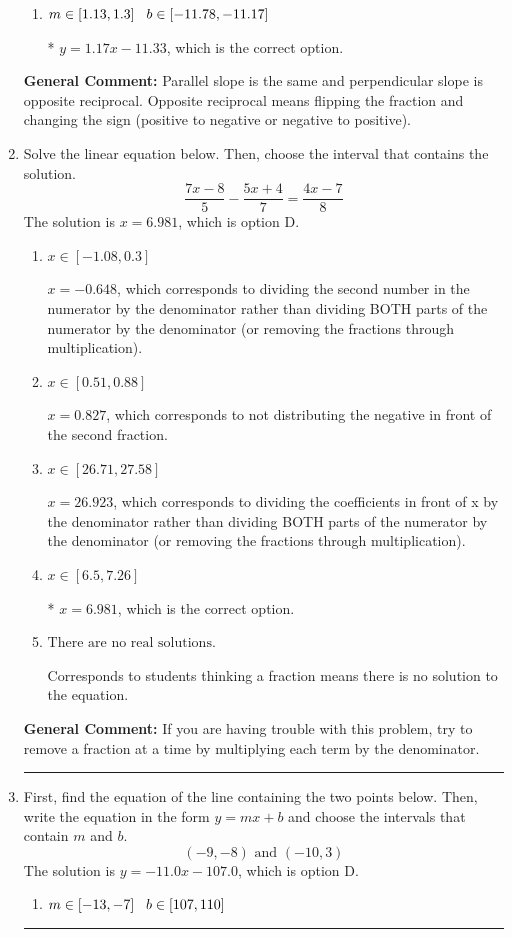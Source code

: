 \documentclass{extbook}[14pt]
\newcommand{\litem}[1]{\item #1

\rule{\textwidth}{0.4pt}}
\begin{document}
\begin{enumerate}
{\begin{enumerate}[label=\Alph*.]
 $y = 1.17x - 11.00$, which corresponds to correct slope and mis-distributing while simplifying to slope-intercept form.
\item \( m \in [1.13, 1.3] \hspace*{3mm} b \in [-11.78, -11.17] \)

* $y = 1.17x - 11.33$, which is the correct option.
\end{enumerate}

\textbf{General Comment:} Parallel slope is the same and perpendicular slope is opposite reciprocal. Opposite reciprocal means flipping the fraction and changing the sign (positive to negative or negative to positive).
}
\litem{
Solve the linear equation below. Then, choose the interval that contains the solution.
\[ \frac{7x -8}{5} - \frac{5x + 4}{7} = \frac{4x -7}{8} \]The solution is \( x = 6.981 \), which is option D.\begin{enumerate}[label=\Alph*.]
\item \( x \in [-1.08, 0.3] \)

 $x = -0.648$, which corresponds to dividing the second number in the numerator by the denominator rather than dividing BOTH parts of the numerator by the denominator (or removing the fractions through multiplication).
\item \( x \in [0.51, 0.88] \)

 $x = 0.827$, which corresponds to not distributing the negative in front of the second fraction.
\item \( x \in [26.71, 27.58] \)

 $x = 26.923$, which corresponds to dividing the coefficients in front of x by the denominator rather than dividing BOTH parts of the numerator by the denominator (or removing the fractions through multiplication).
\item \( x \in [6.5, 7.26] \)

* $x = 6.981$, which is the correct option.
\item \( \text{There are no real solutions.} \)

Corresponds to students thinking a fraction means there is no solution to the equation.
\end{enumerate}

\textbf{General Comment:} If you are having trouble with this problem, try to remove a fraction at a time by multiplying each term by the denominator.
}
\litem{
First, find the equation of the line containing the two points below. Then, write the equation in the form $ y=mx+b $ and choose the intervals that contain $m$ and $b$.
\[ (-9, -8) \text{ and } (-10, 3) \]The solution is \( y = -11.0x -107.0 \), which is option D.\begin{enumerate}[label=\Alph*.]
\item \( m \in [-13, -7] \hspace*{3mm} b \in [107, 110] \)


\end{enumerate}}
\end{enumerate}
\end{document}

